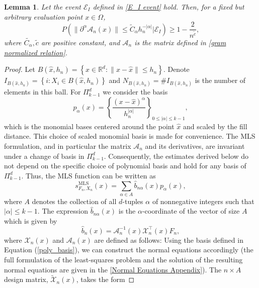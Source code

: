 \documentclass{article}
\newtheorem{lemma}{Lemma}
\newcommand{\mlsfunstoch}{s^\text{MLS}_{F_n,X_n}}
\begin{document}
\begin{lemma}
    Let the event $\mathscr{E}_I$ defined in \eqref{E_I event} hold. Then, for a fixed but arbitrary evaluation point ${x}\in \Omega$,
    \begin{equation}
    P\left(\|\partial^{\alpha} \mathscr{A}_n({x})\| \leq \tilde{C}_\alpha h_n^{-|\alpha|}\Big|\mathscr{E}_I\right) \geq 1 - \frac{2}{n^{\tilde{c}}}, 
\end{equation}
    where $\tilde{C_\alpha},\tilde{c}$ are positive constant, and $\mathscr{A}_n$ is the matrix defined in \eqref{gram normalized relation}.
    \label{lemma 3.6 davoud -bound on dA}
\end{lemma}

\begin{proof}

Let $B\left(\hat{x}, h_n\right)=\left\{x \in \mathbb{R}^d:\|x-\hat{x}\| \leq h_n\right\}$. 
Denote $I_{B\left(\hat{x}, h_n\right)}=\left\{i:X_i\in B(\hat x, h_n)\right\}$ and $N_{B\left(\hat{x}, h_n\right)}=\#I_{B\left(\hat{x}, h_n\right)}$ is the number of elements in this ball.
For $\Pi_{k-1}^d$ we consider the basis
\begin{equation}
    p_\alpha(x)=\left\{\frac{(x - \hat x)^{\alpha}}{h_n^{|{\alpha}|}}\right\}_{0 \leqslant|{\alpha}| \leq k-1},
    \label{poly_basis}
\end{equation}
which is the monomial bases centered around the point $\hat x$ and scaled by the fill distance.
This choice of scaled monomial basis is made for convenience. The MLS formulation, and in particular the matrix $\mathscr{A}_n$ and its derivatives, are invariant under a change of basis in $\Pi_{k-1}^d$. Consequently, the estimates derived below do not depend on the specific choice of polynomial basis and hold for any basis of $\Pi_{k-1}^d$.
Thus, the MLS function can be written as
\begin{equation}
    \mlsfunstoch(x)=\sum_{\alpha\in A} \hat{b}_{n \alpha}(x) p_\alpha(x)
    \label{mls_as_sum}
,\end{equation}
where $A$ denotes the collection of all $d$-tuples $\alpha$ of nonnegative integers such that $|\alpha| \leq k-1$. The expression $\hat{b}_{n\alpha}(x)$ is the $\alpha$-coordinate of the vector of size $A$ which is given by
\begin{equation}
    \hat{b}_n(x)=\mathscr{A}_n^{-1}(x) \mathscr{X}_n^{\top}(x) F_n,
    \label{b_n-alpha}
\end{equation}
where $\mathscr{X}_n(x)$ and $\mathscr{A}_n(x)$ are defined as follows:
Using the basis defined in Equation (\ref{poly_basis}), we can construct the normal equations accordingly (the full formulation of the least-squares problem and the solution of the resulting normal equations are given in the \ref{Normal Equations Appendix}). The $n\times A$ design
matrix, $\tilde{\mathscr{X}}_n(x)$, takes the form 


\end{proof}
\end{document}
